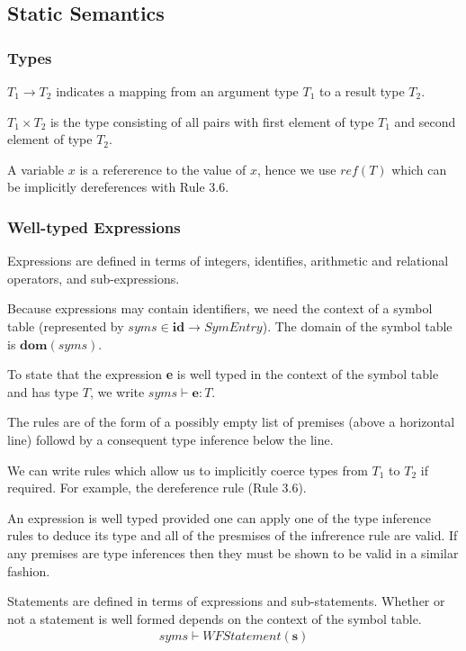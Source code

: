 \subsection{Static Semantics}

\subsubsection{Types}
$T_1 \rightarrow T_2$ indicates a mapping from an argument type $T_1$ to a result type $T_2$.

$T_1 \times T_2$ is the type consisting of all pairs with first element of type $T_1$ and 
second element of type $T_2$.

A variable $x$ is a refererence to the value of $x$, hence we use $ref(T)$ which can be 
implicitly dereferences with Rule 3.6.

\subsubsection{Well-typed Expressions}
Expressions are defined in terms of integers, identifies, arithmetic and relational operators, 
and sub-expressions.

Because expressions may contain identifiers, we need the context of a symbol table (represented 
by $syms \in \textbf{id} \rightarrow SymEntry$).
The domain of the symbol table is $\textbf{dom}(syms)$.

To state that the expression \textbf{e} is well typed in the context of the symbol table and has 
type $T$, we write $syms \vdash \textbf{e} : T$.

The rules are of the form of a possibly empty list of premises (above a horizontal line) followd by 
a consequent type inference below the line.

We can write rules which allow us to implicitly coerce types from $T_1$ to $T_2$ if required. For 
example, the dereference rule (Rule 3.6).

An expression is well typed provided one can apply one of the type inference rules to deduce its
type and all of the presmises of the infrerence rule are valid. If any premises are type inferences
then they must be shown to be valid in a similar fashion.

Statements are defined in terms of expressions and sub-statements. Whether or not a statement is well 
formed depends on the context of the symbol table.
\begin{gather*}
    syms \vdash WFStatement(\textbf{s})
\end{gather*}

